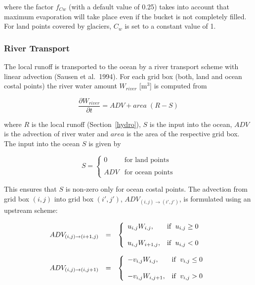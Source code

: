 where the factor $f_{Cw}$ (with a default value of 0.25) takes into account that maximum
evaporation will take place even if the bucket is not completely filled. For land points covered
by glaciers, $C_w$ is set to a
constant value of 1. 

\subsubsection{River Transport}\label{runoff}

The local runoff is transported to the ocean by a river
transport scheme with linear advection 
(Sausen et al.~1994). For each grid box (both, land and
ocean costal points) the river water
amount $W_{river}$ [m$^3$] is computed from  

\begin{equation}
\frac{\partial W_{river}}{\partial t}= ADV + area \; (R - S) 
\end{equation}

where $R$ is the local runoff (Section~\ref{hydro}),
$S$ is the input into the ocean, $ADV$
is the advection of river water and $area$ is the area of the
respective grid box. The input into
the ocean $S$ is given by 

\begin{equation}
S=\left\{ \begin{array}{ll} 0 & \mbox{for land points}
\\
&\\
ADV & \mbox{for ocean points} \end{array}
\right.
\end{equation}

This ensures that $S$ is non-zero only for ocean costal
points. The advection from grid box
$(i,j)$ into grid box $(i',j')$, $ADV_{(i,j)\rightarrow
(i',j')}$, is formulated using an upstream
scheme:

\begin{equation}
\begin{array}{rcl}
\displaystyle ADV_{(i,j)\rightarrow (i+1,j)} & = & \displaystyle \left\{
\begin{array}{ll} u_{i,j} W_{i,j}, & \mbox{if } \;
u_{i,j} \ge 0 \\
                             & \\
                             u_{i,j} W_{i+1,j}, & \mbox{if } \;
u_{i,j} < 0 \end{array} \right. \\
&& \\
\displaystyle ADV_{(i,j)\rightarrow (i,j+1)} & = & \displaystyle \left\{
\begin{array}{ll} -v_{i,j} W_{i,j}, & \mbox{if } \;
v_{i,j} \le 0 \\
                             & \\
                             -v_{i,j} W_{i,j+1}, & \mbox{if } \;
v_{i,j} > 0 \end{array} \right. \\
\end{array}
\end{equation}

